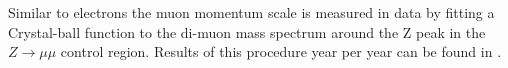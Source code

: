 Similar to electrons the muon momentum scale is measured in data by fitting a Crystal-ball function to the di-muon mass spectrum around the Z peak in the 
$Z \rightarrow \mu\mu$ control region. Results of this procedure year per year can be found in
.


